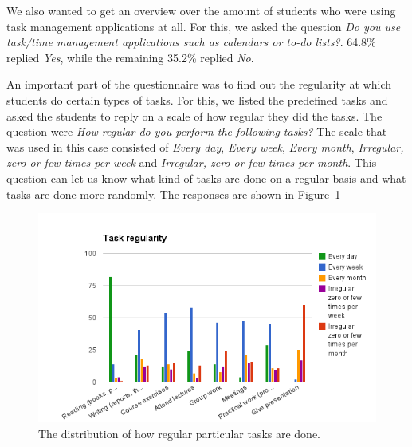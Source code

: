We also wanted to get an overview over the amount of students who were using task management applications at all. For this, we asked the question \emph{Do you use task/time management applications such as calendars or to-do lists?}. 64.8\% replied \emph{Yes}, while the remaining 35.2\% replied \emph{No}.

An important part of the questionnaire was to find out the regularity at which students do certain types of tasks. For this, we listed the predefined tasks and asked the students to reply on a scale of how regular they did the tasks. The question were \emph{How regular do you perform the following tasks?} The scale that was used in this case consisted of \emph{Every day}, \emph{Every week}, \emph{Every month}, \emph{Irregular, zero or few times per week} and \emph{Irregular, zero or few times per month}. This question can let us know what kind of tasks are done on a regular basis and what tasks are done more randomly. The responses are shown in Figure~\ref{fig:taskregularity}
\begin{figure}[tbp]
  \centering
  \includegraphics[width=\textwidth]{figures/TaskRegularity.png}
  \caption[Student task regularity]{The distribution of how regular particular tasks are done.}
  \label{fig:taskregularity}
\end{figure}

